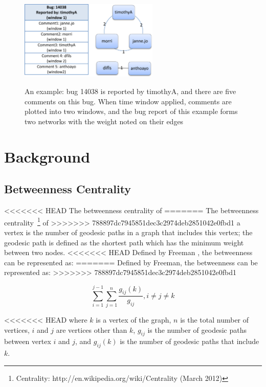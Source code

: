 \documentclass[conference]{IEEEtran}
\begin{document}

\begin{figure}[!t]
\centerline{\includegraphics[width=2.6in,height = 3.8cm]{graph.png}
\label{graph}}
\caption{An example: bug 14038 is reported by timothyA, and there are
  five comments on this bug. 
When time window applied, comments are plotted into two windows, and
the bug report of this example forms two networks with the weight
noted on their edges}

\end{figure}

\section{Background}
\label{background}
\subsection{Betweenness Centrality}

<<<<<<< HEAD
The betweenness centrality of
=======
The betweenness centrality~\footnote[2]{Centrality:
  http://en.wikipedia.org/wiki/Centrality (March 2012)} of
>>>>>>> 788897dc7945851dec3c2974deb2851042e0fbd1
a vertex is the number of geodesic paths in a graph that includes this
vertex;
the geodesic path is defined as the shortest path which has the
minimum weight between two nodes. 
<<<<<<< HEAD
Defined by Freeman \cite{SOCIO:freeman}, the betweenness can be represented as:
=======
Defined by Freeman, the betweenness can be represented as:
>>>>>>> 788897dc7945851dec3c2974deb2851042e0fbd1

\begin{equation} 
\sum_{i=1}^{j-1}\sum_{j=1}^{n}\frac{g_{ij}(k)}{g_{ij}}, i\neq j \neq k
\end{equation}

<<<<<<< HEAD
where $k$ is a vertex of the graph, $n$ is the total number of
vertices, $i$ and $j$ are vertices other than $k$, $g_{ij}$ is the
number of geodesic paths between vertex $i$ and $j$, and $g_{ij}(k)$
is the number of geodesic paths that include $k$.
\end{document}
